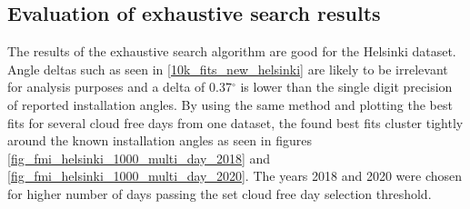 

\newpage
\subsection{Evaluation of exhaustive search results}
The results of the exhaustive search algorithm are good for the Helsinki dataset. Angle deltas such as seen in \ref{10k_fits_new_helsinki} are likely to be irrelevant for analysis purposes and a delta of 0.37$^\circ$ is lower than the single digit precision of reported installation angles. By using the same method and plotting the best fits for several cloud free days from one dataset, the found best fits cluster tightly around the known installation angles as seen in figures \ref{fig_fmi_helsinki_1000_multi_day_2018} and \ref{fig_fmi_helsinki_1000_multi_day_2020}. The years 2018 and 2020 were chosen for higher number of days passing the set cloud free day selection threshold.


